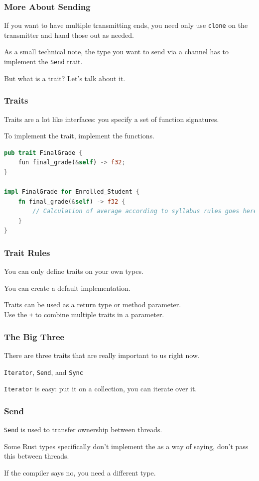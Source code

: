 \begin{frame}
\frametitle{More About Sending}

If you want to have multiple transmitting ends, you need only use \texttt{clone} on the transmitter and hand those out as needed. 


As a small technical note, the type you want to send via a channel has to implement the \texttt{Send} trait.

But what is a trait? Let's talk about it.

\end{frame}


\begin{frame}[fragile]
\frametitle{Traits}

Traits are a lot like interfaces: you specify a set of function signatures.

To implement the trait, implement the functions.

\begin{lstlisting}[language=Rust]
pub trait FinalGrade {
	fun final_grade(&self) -> f32;
}

impl FinalGrade for Enrolled_Student {
    fn final_grade(&self) -> f32 {
        // Calculation of average according to syllabus rules goes here
    }	
}  
\end{lstlisting}

\end{frame}

\begin{frame}
\frametitle{Trait Rules}

You can only define traits on your own types.

You can create a default implementation.

Traits can be used as a return type or method parameter.\\
\quad Use the \texttt{+} to combine multiple traits in a parameter.

\end{frame}


\begin{frame}
\frametitle{The Big Three}

There are three traits that are really important to us right now. 

\texttt{Iterator}, \texttt{Send}, and \texttt{Sync}


\texttt{Iterator} is easy: put it on a collection, you can iterate over it.
\end{frame}


\begin{frame}
\frametitle{Send}

\texttt{Send} is used to transfer ownership between threads.

Some Rust types specifically don't implement the as a way of saying, don't pass this between threads. 

If the compiler says no, you need a different type.

\end{frame}


